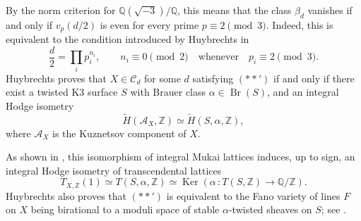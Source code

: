 \documentclass[10pt]{amsart}
\numberwithin{equation}{section}
\theoremstyle{definition}
\theoremstyle{plain}
\numberwithin{theorem}{section}
\DeclareMathOperator{\Br}{Br}
\newcommand{\Q}{\mathbb{Q}}
\newcommand{\Z}{\mathbb{Z}}
\begin{document}
By the norm criterion for $\Q(\sqrt{-3})/\Q$, this means that the class $\beta_d$ vanishes if and only if $v_p(d/2)$ is even for every prime $p \equiv 2 \pmod 3$. Indeed, this is equivalent to the condition introduced by Huybrechts in~\cite[Theorem~1.3]{Huybrechts2015TheKC}
\begin{equation}
\frac d2=\prod_i p_i^{n_i},
\qquad
n_i\equiv0\pmod 2
\quad\text{whenever}\quad
p_i\equiv2\pmod 3.
\tag{$**'$}\label{eq:starprime}
\end{equation}
Huybrechts proves that $X\in\mathcal C_d$ for some $d$ satisfying
$(**')$ if and only if there exist a twisted K3 surface $S$ with Brauer class $\alpha\in\Br(S)$, and an integral Hodge isometry
\begin{equation}\label{eq:hub-mukai}
\widetilde{H}(\mathcal{A}_X, \Z)\simeq\widetilde{H}(S, \alpha, \Z),
\end{equation}
where $\mathcal{A}_X$ is the Kuznetsov component of $X$. 

As shown in \cite[Equation~1.1]{Huybrechts2015TheKC}, this isomorphism of integral Mukai lattices  induces, up to sign, an integral Hodge isometry of transcendental lattices 
\begin{equation}\label{eq:hub}
T_{X,\mathbb Z}(1)\simeq T(S,\alpha,\Z)
 \simeq \operatorname{Ker}(\alpha\,:T(S,\Z)\longrightarrow {\Q}/{\Z}).
\end{equation}
Huybrechts also proves that $(**')$ is equivalent to the Fano variety of lines $F$ on $X$ being
birational to a moduli space of stable \(\alpha\)-twisted sheaves on $S$; see \cite[Proposition~4.1]{Huybrechts2015TheKC}.
\end{document}
